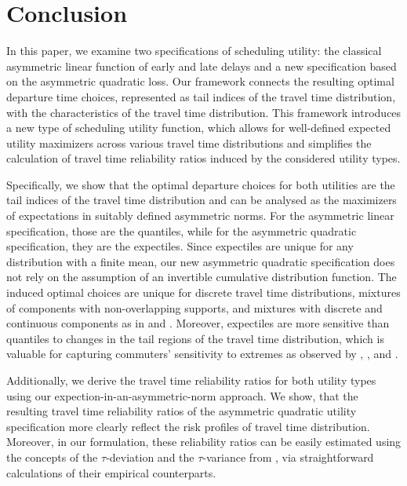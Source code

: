 \documentclass[preprint, 3p, authoryear]{elsarticle} %
\theoremstyle{definition}
\theoremstyle{definition}
\theoremstyle{definition}
\theoremstyle{definition}
\theoremstyle{remark}
\begin{document}
\hypertarget{conclusion}{%
\section{Conclusion}\label{conclusion}}

In this paper, we examine two specifications of scheduling utility: the classical asymmetric linear function of early and late delays and a new specification based on the asymmetric quadratic loss. Our framework connects the resulting optimal departure time choices, represented as tail indices of the travel time distribution, with the characteristics of the travel time distribution. This framework introduces a new type of scheduling utility function, which allows for well-defined expected utility maximizers across various travel time distributions and simplifies the calculation of travel time reliability ratios induced by the considered utility types.

Specifically, we show that the optimal departure choices for both utilities are the tail indices of the travel time distribution and can be analysed as the maximizers of expectations in suitably defined asymmetric norms. For the asymmetric linear specification, those are the quantiles, while for the asymmetric quadratic specification, they are the expectiles. Since expectiles are unique for any distribution with a finite mean, our new asymmetric quadratic specification does not rely on the assumption of an invertible cumulative distribution function. The induced optimal choices are unique for discrete travel time distributions, mixtures of components with non-overlapping supports, and mixtures with discrete and continuous components as in \citet{zheng_fangfang2017} and \citet{depalma2006}. Moreover, expectiles are more sensitive than quantiles to changes in the tail regions of the travel time distribution, which is valuable for capturing commuters' sensitivity to extremes as observed by \citet{enide2006}, \citet{vanlint_etal08}, and \citet{sikka_hanley13}.

Additionally, we derive the travel time reliability ratios for both utility types using our expection-in-an-asymmetric-norm approach. We show, that the resulting travel time reliability ratios of the asymmetric quadratic utility specification more clearly reflect the risk profiles of travel time distribution. Moreover, in our formulation, these reliability ratios can be easily estimated using the concepts of the \(\tau\)-deviation and the \(\tau\)-variance from \citet{tran2019}, via straightforward calculations of their empirical counterparts.
\end{document}
